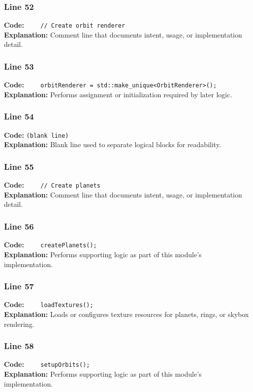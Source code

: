 \documentclass[11pt,a4paper]{article}
\begin{document}
\subsubsection*{Line 52}
\textbf{Code:} \verb|    // Create orbit renderer|\\
\textbf{Explanation:} Comment line that documents intent, usage, or implementation detail.

\subsubsection*{Line 53}
\textbf{Code:} \verb|    orbitRenderer = std::make_unique<OrbitRenderer>();|\\
\textbf{Explanation:} Performs assignment or initialization required by later logic.

\subsubsection*{Line 54}
\textbf{Code:} \texttt{(blank line)}\\
\textbf{Explanation:} Blank line used to separate logical blocks for readability.

\subsubsection*{Line 55}
\textbf{Code:} \verb|    // Create planets|\\
\textbf{Explanation:} Comment line that documents intent, usage, or implementation detail.

\subsubsection*{Line 56}
\textbf{Code:} \verb|    createPlanets();|\\
\textbf{Explanation:} Performs supporting logic as part of this module's implementation.

\subsubsection*{Line 57}
\textbf{Code:} \verb|    loadTextures();|\\
\textbf{Explanation:} Loads or configures texture resources for planets, rings, or skybox rendering.

\subsubsection*{Line 58}
\textbf{Code:} \verb|    setupOrbits();|\\
\textbf{Explanation:} Performs supporting logic as part of this module's implementation.
\end{document}
